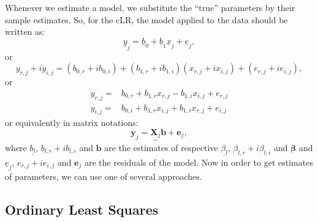 \documentclass[
]{book}
\begin{document}
Whenever we estimate a model, we substitute the ``true'' parameters by their sample estimates. So, for the cLR, the model applied to the data should be written as:
\begin{equation}
    \underline{y}_j = \underline{b}_0 + \underline{b}_1 \underline{x}_j + \underline{e}_j,
    \label{eq:SimpleCLRComplexEstimated}
\end{equation}
or
\begin{equation}
    y_{r,j}+i y_{i,j} = (b_{0,r} + i b_{0,i}) + (b_{1,r} + i b_{1,i}) (x_{r,j}+i x_{i,j}) + (e_{r,j} + i e_{i,j}),
    \label{eq:SimpleCLREstimated}
\end{equation}
or
\begin{equation}
    \begin{aligned}
        y_{r,j} = & b_{0,r} + b_{1,r} x_{r,j} - b_{1,i} x_{i,j} + e_{r,j} \\
        y_{i,j} = & b_{0,i} + b_{1,r} x_{i,j} + b_{1,i} x_{r,j} + e_{i,j}
    \end{aligned}
    \label{eq:SimpleCLRSystemEstimated}
\end{equation}
or equivalently in matrix notations:
\begin{equation}
    \mathbf{y}_j = \underset{\sim}{\mathbf{X}_j} \boldsymbol{b} + \boldsymbol{e}_j ,
    \label{eq:SimpleCLRSystemVector03Estimated}
\end{equation}
where \(\underline{b_{l}}\), \(b_{l,r}+ib_{l,i}\) and \(\boldsymbol{b}\) are the estimates of respective \(\underline{\beta_l}\), \(\beta_{l,r} + i \beta_{l,i}\) and \(\boldsymbol{\beta}\) and \(\underline{e}_j\), \(e_{r,j} + i e_{i,j}\) and \(\boldsymbol{e}_j\) are the residuals of the model. Now in order to get estimates of parameters, we can use one of several approaches.

\hypertarget{SCLREstimationOLS}{%
\subsection{Ordinary Least Squares}\label{SCLREstimationOLS}}
\end{document}
